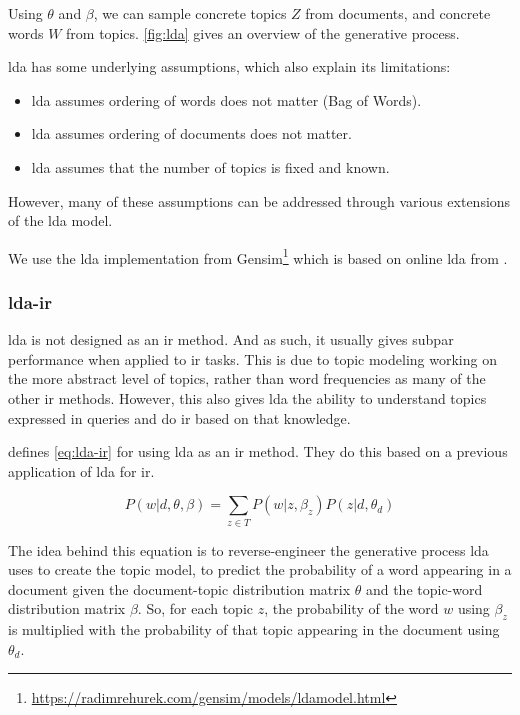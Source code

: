 Using $\theta$ and $\beta$, we can sample concrete topics $Z$ from documents, and concrete words $W$ from topics.
\autoref{fig:lda} gives an overview of the generative process.

\Gls{lda} has some underlying assumptions, which also explain its limitations\cite{blei2012topicmodels}:
\begin{itemize}
	\item \gls{lda} assumes ordering of words does not matter (Bag of Words).
	\item \gls{lda} assumes ordering of documents does not matter.
	\item \gls{lda} assumes that the number of topics is fixed and known.
\end{itemize}
However, many of these assumptions can be addressed through various extensions of the \gls{lda} model\cite{blei2012topicmodels}.

We use the \gls{lda} implementation from Gensim\footnote{\url{https://radimrehurek.com/gensim/models/ldamodel.html}} which is based on online \gls{lda} from \citet{blei2010online}.

\subsubsection{\gls{lda}-\gls{ir}}\label{subsec:lda_ir}
\gls{lda} is not designed as an \acrlong{ir} method.
And as such, it usually gives subpar performance when applied to \gls{ir} tasks.
This is due to topic modeling working on the more abstract level of topics, rather than word frequencies as many of the other \gls{ir} methods.
However, this also gives \gls{lda} the ability to understand topics expressed in queries and do \gls{ir} based on that knowledge.

\citet{yang2009topic} defines \autoref{eq:lda-ir} for using \gls{lda} as an \gls{ir} method.
They do this based on a previous application of \gls{lda} for \gls{ir}\cite{lda-ir}.

\begin{equation}\label{eq:lda-ir}
	P(w|d, \theta, \beta) = \sum_{z \in T} P(w|z,\beta_z) P(z|d,\theta_d)
\end{equation}

The idea behind this equation is to reverse-engineer the generative process \gls{lda} uses to create the topic model, to predict the probability of a word appearing in a document given the document-topic distribution matrix $\theta$ and the topic-word distribution matrix $\beta$.
So, for each topic $z$, the probability of the word $w$ using $\beta_z$ is multiplied with the probability of that topic appearing in the document using $\theta_d$.

